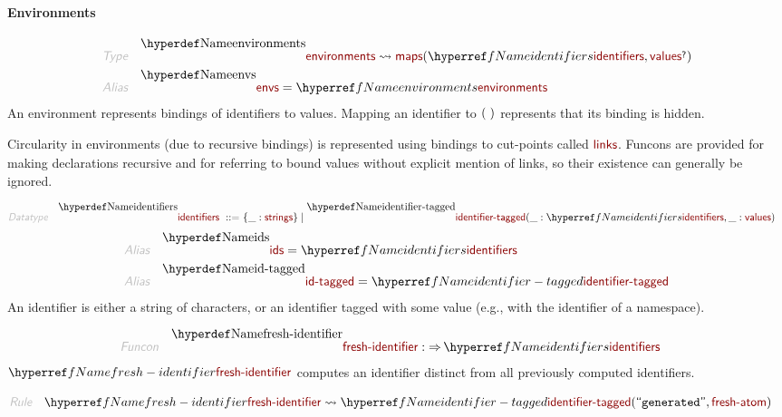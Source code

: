 \paragraph{Environments}\hypertarget{environments}{}\label{environments}

\begin{align*}
  \KEY{Type} \quad 
  & \NAMEDECL{environments}  
    \leadsto \NAMEHYPER{../../../Values/Composite}{Maps}{maps}
               (  \NAMEREF{identifiers}, 
                      \NAMEHYPER{../../../Values}{Value-Types}{values}\QUERY )
\\
  \KEY{Alias} \quad
  & \NAMEDECL{envs} = \NAMEREF{environments}
\end{align*}
An environment represents bindings of identifiers to values.
  Mapping an identifier to $\strut(   \  )\strut$ represents that its binding is hidden.

Circularity in environments (due to recursive bindings) is represented using
  bindings to cut-points called $\SHADE{\NAMEHYPER{../.}{Linking}{links}}$. Funcons are provided for making
  declarations recursive and for referring to bound values without explicit
  mention of links, so their existence can generally be ignored.

\begin{align*}
  \KEY{Datatype} \quad 
  \NAMEDECL{identifiers} 
  \ ::= \ &
  \{ \_ : \NAMEHYPER{../../../Values/Composite}{Strings}{strings} \} \mid \NAMEDECL{identifier-tagged}(
                     \_ : \NAMEREF{identifiers}, \_ : \NAMEHYPER{../../../Values}{Value-Types}{values})
\end{align*}
\begin{align*}
  \KEY{Alias} \quad
  & \NAMEDECL{ids} = \NAMEREF{identifiers}
\\
  \KEY{Alias} \quad
  & \NAMEDECL{id-tagged} = \NAMEREF{identifier-tagged}
\end{align*}
An identifier is either a string of characters, or an identifier tagged with
  some value (e.g., with the identifier of a namespace).

\begin{align*}
  \KEY{Funcon} \quad
  & \NAMEDECL{fresh-identifier} 
    :  \TO \NAMEREF{identifiers} 
\end{align*}
$\SHADE{\NAMEREF{fresh-identifier}}$ computes an identifier distinct from all previously
  computed identifiers.

\begin{align*}
  \KEY{Rule} \quad
    & \NAMEREF{fresh-identifier} \leadsto 
        \NAMEREF{identifier-tagged}
          (  \STRING{generated}, 
                 \NAMEHYPER{../.}{Generating}{fresh-atom} )
\end{align*}
